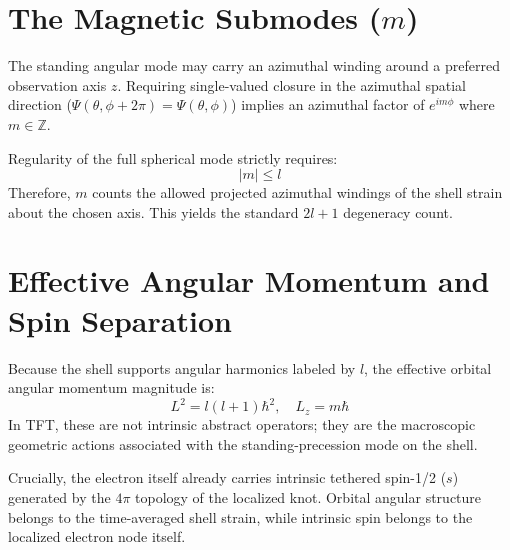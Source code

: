 \section{The Magnetic Submodes ($m$)}
The standing angular mode may carry an azimuthal winding around a preferred observation axis $z$. Requiring single-valued closure in the azimuthal spatial direction ($\Psi(\theta,\phi+2\pi) = \Psi(\theta,\phi)$) implies an azimuthal factor of $e^{im\phi}$ where $m \in \mathbb{Z}$.

Regularity of the full spherical mode strictly requires:
\begin{equation}
    |m| \leq l
\end{equation}
Therefore, $m$ counts the allowed projected azimuthal windings of the shell strain about the chosen axis. This yields the standard $2l+1$ degeneracy count.

\section{Effective Angular Momentum and Spin Separation}
Because the shell supports angular harmonics labeled by $l$, the effective orbital angular momentum magnitude is:
\begin{equation}
    L^2 = l(l+1)\hbar^2, \quad L_z = m\hbar
\end{equation}
In TFT, these are not intrinsic abstract operators; they are the macroscopic geometric actions associated with the standing-precession mode on the shell.

Crucially, the electron itself already carries intrinsic tethered spin-1/2 ($s$) generated by the $4\pi$ topology of the localized knot. Orbital angular structure belongs to the time-averaged shell strain, while intrinsic spin belongs to the localized electron node itself.
